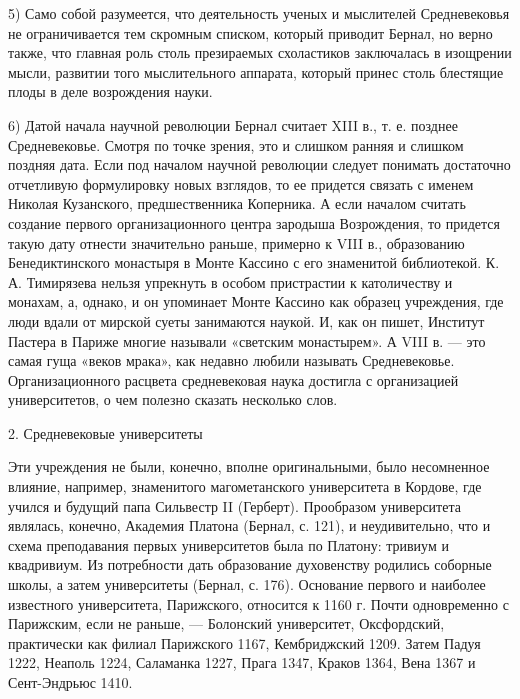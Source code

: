 5)  Само  собой  разумеется,  что  деятельность  ученых  и  мыслителей
Средневековья не ограничивается тем скромным списком, который приводит
Бернал, но верно также, что главная роль столь презираемых схоластиков
заключалась в  изощрении мысли, развитии того  мыслительного аппарата,
который принес столь блестящие плоды в деле возрождения науки.

6)  Датой  начала  научной  революции   Бернал  считает  XIII  в.,  т.
е.  позднее  Средневековье. Смотря  по  точке  зрения, это  и  слишком
ранняя  и слишком  поздняя дата.  Если под  началом научной  революции
следует понимать достаточно отчетливую формулировку новых взглядов, то
ее  придется  связать  с именем  Николая  Кузанского,  предшественника
Коперника. А  если началом  считать создание  первого организационного
центра   зародыша  Возрождения,   то  придется   такую  дату   отнести
значительно раньше,  примерно к  VIII в.,  образованию Бенедиктинского
монастыря  в  Монте  Кассино  с  его  знаменитой  библиотекой.  К.  А.
Тимирязева  нельзя  упрекнуть  в  особом  пристрастии  к  католичеству
и  монахам,  а, однако,  и  он  упоминает  Монте Кассино  как  образец
учреждения,  где люди  вдали от  мирской суеты  занимаются наукой.  И,
как  он пишет,  Институт Пастера  в Париже  многие называли  «светским
монастырем». А VIII  в. --- это самая гуща «веков  мрака», как недавно
любили называть Средневековье. Организационного расцвета средневековая
наука  достигла с  организацией университетов,  о чем  полезно сказать
несколько слов.

2. Средневековые университеты

Эти   учреждения  не   были,  конечно,   вполне  оригинальными,   было
несомненное влияние, например, знаменитого магометанского университета
в  Кордове,  где  учился  и   будущий  папа  Сильвестр  II  (Герберт).
Прообразом университета  являлась, конечно, Академия  Платона (Бернал,
с.   121),  и   неудивительно,   что  и   схема  преподавания   первых
университетов была  по Платону:  тривиум и квадривиум.  Из потребности
дать  образование   духовенству  родились  соборные  школы,   а  затем
университеты (Бернал, с. 176). Основание первого и наиболее известного
университета,  Парижского, относится  к 1160  г. Почти  одновременно с
Парижским,  если не  раньше, ---  Болонский университет,  Оксфордский,
практически как филиал Парижского 1167, Кембриджский 1209. Затем Падуя
1222, Неаполь 1224, Саламанка 1227, Прага 1347, Краков 1364, Вена 1367
и Сент-Эндрьюс 1410.

